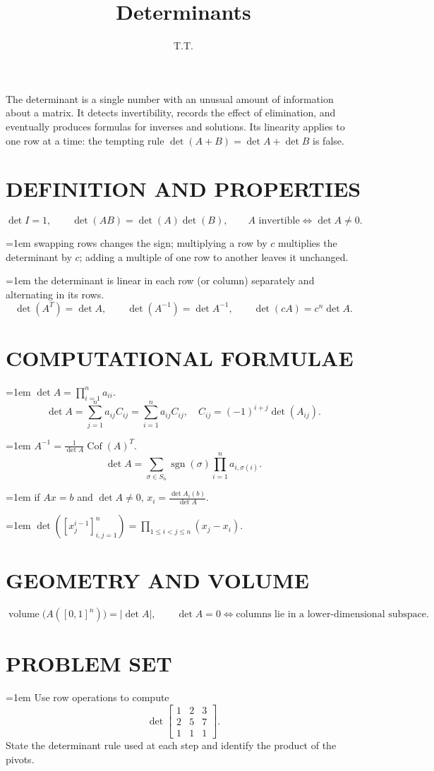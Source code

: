 \documentclass[11pt]{article}
\title{Determinants}\author{T.T.}\date{}
\newcommand{\topic}[1]{\par\leftskip=0pt\section*{\normalfont\large #1}}\newcommand{\initial}[1]{{\Large #1}}\newcommand{\result}[1]{\par\leftskip=0pt\medskip\noindent\hspace*{1em}{\bfseries #1}\par\nobreak\leftskip=1em\noindent}\renewcommand{\textbf}[1]{\result{#1}}
\newcommand{\question}[1]{\par\leftskip=0pt\medskip\noindent{\bfseries Q#1.}\par\nobreak\leftskip=1em\noindent}
\newenvironment{chaptermap}{\begin{center}\begin{minipage}{0.82\textwidth}\small}{\end{minipage}\end{center}\medskip}
\begin{document}
\maketitle
\begin{chaptermap}\noindent The determinant is a single number with an unusual amount of information about a matrix. It detects invertibility, records the effect of elimination, and eventually produces formulas for inverses and solutions. Its linearity applies to one row at a time: the tempting rule $\det(A+B)=\det A+\det B$ is false.\par{}\end{chaptermap}
\topic{\initial{D}EFINITION AND \initial{P}ROPERTIES}
\[\det I=1,\qquad \det(AB)=\det(A)\det(B),\qquad A\text{ invertible}\Longleftrightarrow\det A\ne0.\]
\textbf{Row rules:} swapping rows changes the sign; multiplying a row by $c$ multiplies the determinant by $c$; adding a multiple of one row to another leaves it unchanged.
\textbf{Linearity:} the determinant is linear in each row (or column) separately and alternating in its rows.
\[\det({A}^{T})=\det A,\qquad \det({A}^{-1})={\det A}^{-1},\qquad \det(cA)=c^n\det A.\]
\topic{\initial{C}OMPUTATIONAL \initial{F}ORMULAE}
\textbf{Triangular matrices:} $\det A=\prod_{i=1}^n a_{ii}$.
\[\det A=\sum_{j=1}^n a_{ij}C_{ij}=\sum_{i=1}^n a_{ij}C_{ij},\quad C_{ij}={(-1)}^{i+j}\det(A_{ij}).\]
\textbf{Cofactor formula:} $\displaystyle {A}^{-1}=\frac{1}{\det A}{\operatorname{Cof}(A)}^{T}$.
\[\det A=\sum_{\sigma\in S_n}\operatorname{sgn}(\sigma)\prod_{i=1}^n a_{i,\sigma(i)}.\]
\textbf{Cramer's rule:} if $Ax=b$ and $\det A\ne0$, $\displaystyle x_i=\frac{\det A_i(b)}{\det A}$.
\textbf{Vandermonde determinant:} $\displaystyle \det\!\left({[x_j^{i-1}]}_{i,j=1}^n\right)=\prod_{1\leq i<j\leq n}(x_j-x_i)$.
\topic{\initial{G}EOMETRY AND \initial{V}OLUME}
\[\operatorname{volume}\bigl(A({[0,1]}^n)\bigr)=|\det A|,\qquad \det A=0\Longleftrightarrow\text{columns lie in a lower-dimensional subspace}.\]
\newpage
\setlength{\parindent}{0pt}
\topic{\initial{P}ROBLEM \initial{S}ET}

\question{1} Use row operations to compute
\[
\det\begin{bmatrix}
1&2&3\\
2&5&7\\
1&1&1
\end{bmatrix}.
\]
State the determinant rule used at each step and identify the product of the pivots.
\end{document}
